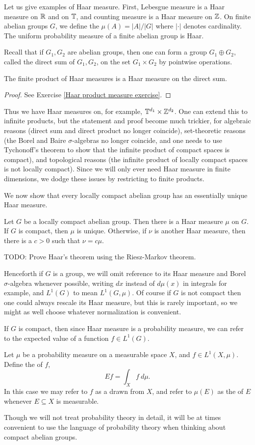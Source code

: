 Let us give examples of Haar measure.
First, Lebesgue measure is a Haar measure on $\mathbb{R}$ and on $\mathbb{T}$, and counting measure is a Haar measure on $\mathbb{Z}$.
On finite abelian groups $G$, we define the  $\mu(A) = |A|/|G|$ where $|\cdot|$ denotes cardinality.
The uniform probability measure of a finite abelian group is Haar.

Recall that if $G_1, G_2$ are abelian groups, then one can form a group $G_1 \oplus G_2$, called the direct sum of $G_1,G_2$, on the set $G_1 \times G_2$ by pointwise operations.
\begin{lemma}
\label{Haar product measure}
The finite product of Haar measures is a Haar measure on the direct sum.
\end{lemma}
\begin{proof}
See Exercise \ref{Haar product measure exercise}.
\end{proof}
Thus we have Haar measures on, for example, $\mathbb{T}^{d_1} \times \mathbb{Z}^{d_2}$.
One can extend this to infinite products, but the statement and proof become much trickier, for algebraic reasons (direct sum and direct product no longer coincide), set-theoretic reasons (the Borel and Baire $\sigma$-algebras no longer coincide, and one needs to use Tychonoff's theorem to show that the infinite product of compact spaces is compact), and topological reasons (the infinite product of locally compact spaces is not locally compact).
Since we will only ever need Haar measure in finite dimensions, we dodge these issues by restricting to finite products.

We now show that every locally compact abelian group has an essentially unique Haar measure.
\begin{theorem}
Let $G$ be a locally compact abelian group.
Then there is a Haar measure $\mu$ on $G$.
If $G$ is compact, then $\mu$ is unique.
Otherwise, if $\nu$ is another Haar measure, then there is a $c > 0$ such that $\nu = c\mu$.
\end{theorem}
TODO: Prove Haar's theorem using the Riesz-Markov theorem.

Henceforth if $G$ is a group, we will omit reference to its Haar measure and Borel $\sigma$-algebra whenever possible, writing $dx$ instead of $d\mu(x)$ in integrals for example, and $L^1(G)$ to mean $L^1(G, \mu)$.
Of course if $G$ is not compact then one could always rescale its Haar measure, but this is rarely important, so we might as well choose whatever normalization is convenient.

If $G$ is compact, then since Haar measure is a probability measure, we can refer to the expected value of a function $f \in L^1(G)$.
\begin{definition}
Let $\mu$ be a probability measure on a measurable space $X$, and $f \in L^1(X, \mu)$.
Define the  of $f$,
$$Ef = \int_X f~d\mu.$$
In this case we may refer to $f$ as a  drawn from $X$, and refer to $\mu(E)$ as the  of $E$ whenever $E \subseteq X$ is measurable.
\end{definition}
Though we will not treat probability theory in detail, it will be at times convenient to use the language of probability theory when thinking about compact abelian groups.


